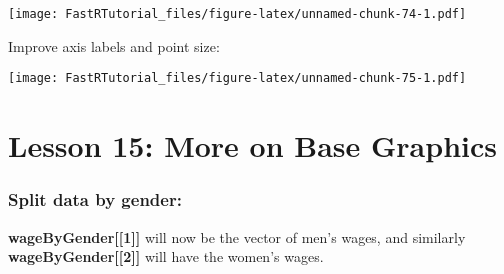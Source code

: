 \documentclass[
]{article}
\newenvironment{Shaded}{\begin{snugshade}}{\end{snugshade}}
\newcommand{\AttributeTok}[1]{\textcolor[rgb]{0.77,0.63,0.00}{#1}}
\newcommand{\CommentTok}[1]{\textcolor[rgb]{0.56,0.35,0.01}{\textit{#1}}}
\newcommand{\DecValTok}[1]{\textcolor[rgb]{0.00,0.00,0.81}{#1}}
\newcommand{\FloatTok}[1]{\textcolor[rgb]{0.00,0.00,0.81}{#1}}
\newcommand{\FunctionTok}[1]{\textcolor[rgb]{0.00,0.00,0.00}{#1}}
\newcommand{\NormalTok}[1]{#1}
\newcommand{\OtherTok}[1]{\textcolor[rgb]{0.56,0.35,0.01}{#1}}
\newcommand{\SpecialCharTok}[1]{\textcolor[rgb]{0.00,0.00,0.00}{#1}}
\newcommand{\StringTok}[1]{\textcolor[rgb]{0.31,0.60,0.02}{#1}}
\begin{document}
\texttt{[image: FastRTutorial\_files/figure-latex/unnamed-chunk-74-1.pdf]}

Improve axis labels and point size:

\begin{Shaded}
\end{Shaded}

\texttt{[image: FastRTutorial\_files/figure-latex/unnamed-chunk-75-1.pdf]}

\hypertarget{lesson-15-more-on-base-graphics}{%
\section{Lesson 15: More on Base
Graphics}\label{lesson-15-more-on-base-graphics}}

\hypertarget{split-data-by-gender}{%
\subsubsection{Split data by gender:}\label{split-data-by-gender}}

\begin{Shaded}
\end{Shaded}

\textbf{wageByGender{[}{[}1{]}{]}} will now be the vector of men's
wages, and similarly \textbf{wageByGender{[}{[}2{]}{]}} will have the
women's wages.
\end{document}
